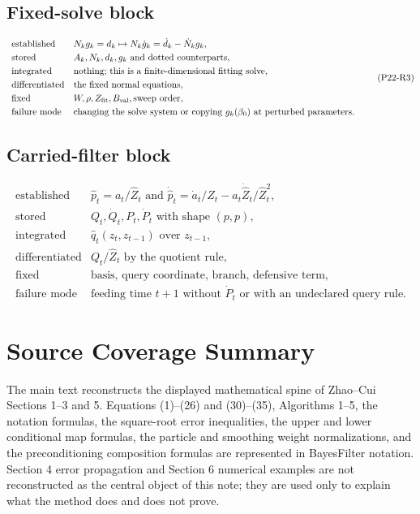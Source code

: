\documentclass[11pt]{article}
\begin{document}
\subsection*{Fixed-solve block}

\[
\begin{array}{ll}
\text{established} &
    N_k g_k=d_k
    \mapsto
    N_k\dot g_k=\dot d_k-\dot N_k g_k,\\[1mm]
\text{stored} &
    A_k,N_k,d_k,g_k \text{ and dotted counterparts},\\[1mm]
\text{integrated} &
    \text{nothing; this is a finite-dimensional fitting solve},\\[1mm]
\text{differentiated} &
    \text{the fixed normal equations},\\[1mm]
\text{fixed} &
    W,\rho,Z_{\rm fit},B_{\rm val},\text{sweep order},\\[1mm]
\text{failure mode} &
    \text{changing the solve system or copying }g_k(\beta_0)
    \text{ at perturbed parameters.}
\end{array}
\tag{P22-R3}
\]

\subsection*{Carried-filter block}

\[
\begin{array}{ll}
\text{established} &
    \widehat p_t=a_t/\widehat Z_t
    \text{ and }
    \dot{\widehat p}_t=\dot a_t/\widehat Z_t
    -a_t\dot{\widehat Z}_t/\widehat Z_t^2,\\[1mm]
\text{stored} &
    Q_t,\dot Q_t,P_t,\dot P_t
    \text{ with shape }(p,p),\\[1mm]
\text{integrated} &
    \widehat q_t(z_t,z_{t-1}) \text{ over } z_{t-1},\\[1mm]
\text{differentiated} &
    Q_t/\widehat Z_t \text{ by the quotient rule},\\[1mm]
\text{fixed} &
    \text{basis, query coordinate, branch, defensive term},\\[1mm]
\text{failure mode} &
    \text{feeding time }t+1\text{ without }\dot P_t
    \text{ or with an undeclared query rule.}
\end{array}
\tag{P22-R4}
\]

\appendix
\section{Source Coverage Summary}

The main text reconstructs the displayed mathematical spine of Zhao--Cui
Sections 1--3 and 5.  Equations (1)--(26) and (30)--(35), Algorithms 1--5,
the notation formulas, the square-root error inequalities, the upper and lower
conditional map formulas, the particle and smoothing weight normalizations, and
the preconditioning composition formulas are represented in BayesFilter
notation.  Section 4 error propagation and Section 6 numerical examples are
not reconstructed as the central object of this note; they are used only to
explain what the method does and does not prove.
\end{document}
